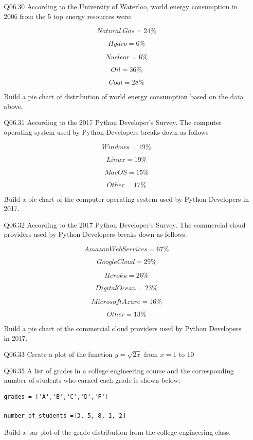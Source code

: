 \documentclass{book}
\newenvironment{problems}{}{}  %
\begin{document}
    
        \begin{problems}
        Q06.30 According to the University of Waterloo, world energy consumption
in 2006 from the 5 top energy resources were:

\[ Natural \ Gas = 24\% \]

\[ Hydro = 6\% \]

\[ Nuclear = 6\% \]

\[ Oil = 36\% \]

\[ Coal = 28\% \]

Build a pie chart of distribution of world energy consumption based on
the data above.

Q06.31 According to the 2017 Python Developer's Survey. The computer
operating system used by Python Developers breaks down as follows

\[ Windows = 49\% \]

\[ Linux = 19\% \]

\[ MacOS = 15\% \]

\[ Other = 17\% \]

Build a pie chart of the computer operating system used by Python
Developers in 2017.

Q06.32 According to the 2017 Python Developer's Survey. The commercial
cloud providers used by Python Developers breaks down as follows:

\[ Amazon Web Services = 67\% \]

\[ Google Cloud = 29\% \]

\[ Heroku = 26\% \]

\[ Digital Ocean = 23\% \]

\[ Microsoft Azure = 16\% \]

\[ Other = 13\% \]

Build a pie chart of the commercial cloud providers used by Python
Developers in 2017.

Q06.33 Create a plot of the function \(y=\sqrt{2x}\) from \(x = 1\) to
\(10\)

Q06.35 A list of grades in a college engineering course and the
corresponding number of students who earned each grade is shown below:

\begin{lstlisting}
grades = ['A','B','C','D','F']

number_of_students =[3, 5, 8, 1, 2]
\end{lstlisting}

Build a bar plot of the grade distribution from the college engineering
class.


\end{problems}
\end{document}
